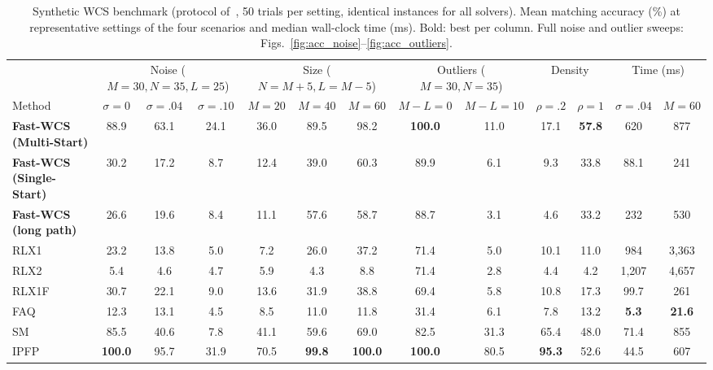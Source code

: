 \begin{table}[!t]
\centering
\caption{Synthetic WCS benchmark (protocol of~\cite{yang2018algorithm}, 50 trials per setting, identical instances for all solvers). Mean matching accuracy (\%) at representative settings of the four scenarios and median wall-clock time (ms). Bold: best per column. Full noise and outlier sweeps: Figs.~\ref{fig:acc_noise}--\ref{fig:acc_outliers}.}
\label{tab:synthetic}
\fontsize{6.6}{7.9}\selectfont
\setlength{\tabcolsep}{2.6pt}
\begin{tabular*}{\textwidth}{@{\extracolsep{\fill}}lcccccccccccc@{}}
\toprule
 & \multicolumn{3}{c}{Noise ($M{=}30,N{=}35,L{=}25$)} & \multicolumn{3}{c}{Size ($N{=}M{+}5,L{=}M{-}5$)} & \multicolumn{2}{c}{Outliers ($M{=}30,N{=}35$)} & \multicolumn{2}{c}{Density} & \multicolumn{2}{c}{Time (ms)} \\
\cmidrule(lr){2-4}\cmidrule(lr){5-7}\cmidrule(lr){8-9}\cmidrule(lr){10-11}\cmidrule(l){12-13}
Method & $\sigma{=}0$ & $\sigma{=}.04$ & $\sigma{=}.10$ & $M{=}20$ & $M{=}40$ & $M{=}60$ & $M{-}L{=}0$ & $M{-}L{=}10$ & $\rho{=}.2$ & $\rho{=}1$ & $\sigma{=}.04$ & $M{=}60$ \\
\midrule
\textbf{Fast-WCS (Multi-Start)} & 88.9 & 63.1 & 24.1 & 36.0 & 89.5 & 98.2 & \textbf{100.0} & 11.0 & 17.1 & \textbf{57.8} & 620 & 877 \\
\textbf{Fast-WCS (Single-Start)} & 30.2 & 17.2 & 8.7 & 12.4 & 39.0 & 60.3 & 89.9 & 6.1 & 9.3 & 33.8 & 88.1 & 241 \\
\textbf{Fast-WCS (long path)} & 26.6 & 19.6 & 8.4 & 11.1 & 57.6 & 58.7 & 88.7 & 3.1 & 4.6 & 33.2 & 232 & 530 \\
\midrule
RLX1~\cite{yang2018algorithm} & 23.2 & 13.8 & 5.0 & 7.2 & 26.0 & 37.2 & 71.4 & 5.0 & 10.1 & 11.0 & 984 & 3{,}363 \\
RLX2~\cite{yang2018algorithm} & 5.4 & 4.6 & 4.7 & 5.9 & 4.3 & 8.8 & 71.4 & 2.8 & 4.4 & 4.2 & 1{,}207 & 4{,}657 \\
RLX1F~\cite{yang2018algorithm} & 30.7 & 22.1 & 9.0 & 13.6 & 31.9 & 38.8 & 69.4 & 5.8 & 10.8 & 17.3 & 99.7 & 261 \\
\midrule
FAQ~\cite{vogelstein2015fast} & 12.3 & 13.1 & 4.5 & 8.5 & 11.0 & 11.8 & 31.4 & 6.1 & 7.8 & 13.2 & \textbf{5.3} & \textbf{21.6} \\
SM~\cite{leordeanu2005} & 85.5 & 40.6 & 7.8 & 41.1 & 59.6 & 69.0 & 82.5 & 31.3 & 65.4 & 48.0 & 71.4 & 855 \\
IPFP~\cite{leordeanu2009ipfp} & \textbf{100.0} & 95.7 & 31.9 & 70.5 & \textbf{99.8} & \textbf{100.0} & \textbf{100.0} & 80.5 & \textbf{95.3} & 52.6 & 44.5 & 607 \\

\end{tabular*}
\end{table}

